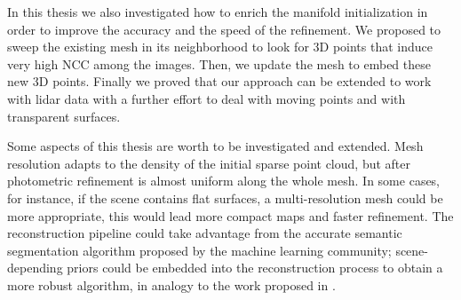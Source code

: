 In this thesis we also investigated how to enrich the manifold initialization in order to improve the accuracy and the speed of the refinement. 
We proposed to sweep the existing mesh in its neighborhood to look for 3D points that induce very high NCC among the images. Then, we  update the mesh to embed these new 3D points.
Finally we proved that our approach can be extended to work with lidar data with a further effort to deal with moving points and with transparent surfaces.

Some aspects of this thesis are worth to be investigated and extended. 
Mesh resolution adapts to the density of the initial sparse point cloud, but after photometric refinement is almost uniform along the whole mesh. In some cases, for instance, if the scene contains flat surfaces, a multi-resolution mesh could be more appropriate, this would lead more compact maps and faster refinement.
The reconstruction pipeline could take advantage from the accurate semantic segmentation algorithm proposed by the machine learning community; scene-depending priors could be embedded into the reconstruction process to obtain a more robust algorithm, in analogy to the work proposed in  \cite{savinov2016semantic,HaZa16}.

















